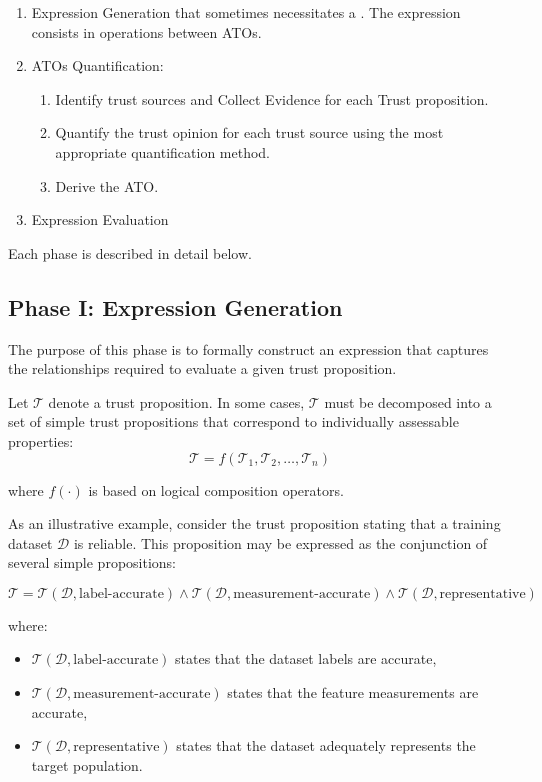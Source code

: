 \begin{enumerate}
    \item Expression Generation that sometimes necessitates a . The expression consists in operations between \acp{ATO}.
    \item \acp{ATO} Quantification:
    \begin{enumerate}
        \item Identify trust sources and Collect Evidence for each Trust proposition.
        \item Quantify the trust opinion for each trust source using the most appropriate quantification method.
        \item Derive the \ac{ATO}.
    \end{enumerate}
    \item Expression Evaluation
\end{enumerate}

Each phase is described in detail below.

\subsection{Phase I: Expression Generation}
\label{subsec:ch4_expression_generation}

The purpose of this phase is to formally construct an expression that captures the relationships required to evaluate a given trust proposition.

Let $\mathcal{T}$ denote a trust proposition. In some cases, $\mathcal{T}$ must be decomposed into a set of simple trust propositions that correspond to individually assessable properties:
\[
\mathcal{T} = f(\mathcal{T}_1, \mathcal{T}_2, \dots, \mathcal{T}_n)
\]

where $f(\cdot)$ is based on logical composition operators.

As an illustrative example, consider the trust proposition stating that a training dataset $\mathcal{D}$ is reliable. This proposition may be expressed as the conjunction of several simple propositions:

\[
\mathcal{T} =
\mathcal{T}(\mathcal{D},\text{label-accurate})
\wedge
\mathcal{T}(\mathcal{D},\text{measurement-accurate})
\wedge
\mathcal{T}(\mathcal{D},\text{representative})
\]

where:
\begin{itemize}
    \item $\mathcal{T}(\mathcal{D},\text{label-accurate})$ states that the dataset labels are accurate,
    \item $\mathcal{T}(\mathcal{D},\text{measurement-accurate})$ states that the feature measurements are accurate,
    \item $\mathcal{T}(\mathcal{D},\text{representative})$ states that the dataset adequately represents the target population.
\end{itemize}

